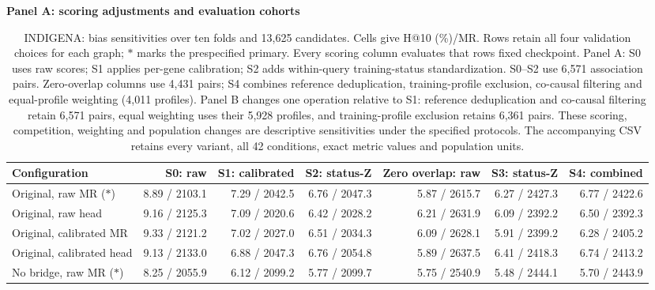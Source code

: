 \begin{landscape}
\begin{table}[p]
\centering\footnotesize
\setlength{\tabcolsep}{3pt}
\caption{INDIGENA: bias sensitivities over ten folds and 13,625 candidates. Cells give H@10 (\%)/MR. Rows retain all four validation choices for each graph; $\ast$ marks the prespecified primary. Every scoring column evaluates that row\textquotesingle s fixed checkpoint. Panel A: S0 uses raw scores; S1 applies per-gene calibration; S2 adds within-query training-status standardization. S0--S2 use 6,571 association pairs. Zero-overlap columns use 4,431 pairs; S4 combines reference deduplication, training-profile exclusion, co-causal filtering and equal-profile weighting (4,011 profiles). Panel B changes one operation relative to S1: reference deduplication and co-causal filtering retain 6,571 pairs, equal weighting uses their 5,928 profiles, and training-profile exclusion retains 6,361 pairs. These scoring, competition, weighting and population changes are descriptive sensitivities under the specified protocols. The accompanying CSV retains every variant, all 42 conditions, exact metric values and population units.}
\label{tab:matched_bias_INDIGENA}
\textbf{Panel A: scoring adjustments and evaluation cohorts}\par\smallskip
\begin{adjustbox}{max width=\linewidth}
\begin{tabular}{lrrrrrr}
\toprule
Configuration & S0: raw & S1: calibrated & S2: status-Z & Zero overlap: raw & S3: status-Z & S4: combined \\
\midrule
Original, raw MR ($\ast$) & 8.89 / 2103.1 & 7.29 / 2042.5 & 6.76 / 2047.3 & 5.87 / 2615.7 & 6.27 / 2427.3 & 6.77 / 2422.6 \\
Original, raw head & 9.16 / 2125.3 & 7.09 / 2020.6 & 6.42 / 2028.2 & 6.21 / 2631.9 & 6.09 / 2392.2 & 6.50 / 2392.3 \\
Original, calibrated MR & 9.33 / 2121.2 & 7.02 / 2027.0 & 6.51 / 2034.3 & 6.09 / 2628.1 & 5.91 / 2399.2 & 6.28 / 2405.2 \\
Original, calibrated head & 9.13 / 2133.0 & 6.88 / 2047.3 & 6.76 / 2054.8 & 5.89 / 2637.5 & 6.41 / 2418.3 & 6.74 / 2413.2 \\
No bridge, raw MR ($\ast$) & 8.25 / 2055.9 & 6.12 / 2099.2 & 5.77 / 2099.7 & 5.75 / 2540.9 & 5.48 / 2444.1 & 5.70 / 2443.9 \\

\end{tabular}
\end{adjustbox}
\end{table}
\end{landscape}
